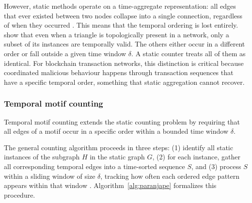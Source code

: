 However, static methods operate on a time-aggregate representation: all edges that ever existed between two nodes collapse into a single connection, regardless of when they occurred \citep{kovanen2011temporal}. This means that the temporal ordering is lost entirely. \citet{paranjape2017motifs} show that even when a triangle is topologically present in a network, only a subset of its instances are temporally valid. The others either occur in a different order or fall outside a given time window $\delta$. A static counter treats all of them as identical. For blockchain transaction networks, this distinction is critical because coordinated malicious behaviour happens through transaction sequences that have a specific temporal order, something that static aggregation cannot recover.

\subsubsection{Temporal motif counting}
Temporal motif counting extends the static counting problem by requiring that all edges of a motif occur in a specific order within a bounded time window $\delta$. 

The general counting algorithm proceeds in three steps: (1) identify all
static instances of the subgraph $H$ in the static graph $G$,
(2) for each instance, gather all corresponding temporal edges into a
time-sorted sequence $S$, and (3) process $S$ within a sliding window of
size $\delta$, tracking how often each ordered edge pattern appears
within that window \citep{paranjape2017motifs}. Algorithm~\ref{alg:paranjape}
formalizes this procedure.

